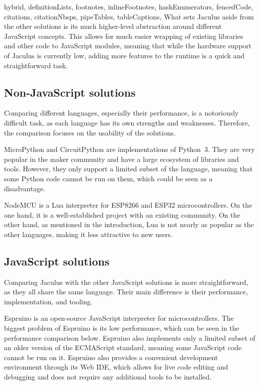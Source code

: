 \begin{markdown*}{%
  hybrid,
  definitionLists,
  footnotes,
  inlineFootnotes,
  hashEnumerators,
  fencedCode,
  citations,
  citationNbsps,
  pipeTables,
  tableCaptions,
}
What sets Jaculus aside from the other solutions is its much higher-level abstraction around different JavaScript concepts. This allows for much easier wrapping of existing libraries and other code to JavaScript modules, meaning that while the hardware support of Jaculus is currently low, adding more features to the runtime is a quick and straightforward task.

\subsection{Non-JavaScript solutions}

Comparing different languages, especially their performance, is a notoriously difficult task, as each language has its own strengths and weaknesses. Therefore, the comparison focuses on the usability of the solutions.

MicroPython and CircuitPython are implementations of Python~3. They are very popular in the maker community and have a large ecosystem of libraries and tools. However, they only support a limited subset of the language, meaning that some Python code cannot be run on them, which could be seen as a disadvantage.

NodeMCU is a Lua interpreter for ESP8266 and ESP32 microcontrollers. On the one hand, it is a well-established project with an existing community. On the other hand, as mentioned in the introduction, Lua is not nearly as popular as the other languages, making it less attractive to new users.

\subsection{JavaScript solutions}

Comparing Jaculus with the other JavaScript solutions is more straightforward, as they all share the same language. Their main difference is their performance, implementation, and tooling.

Espruino is an open-source JavaScript interpreter for microcontrollers. The biggest problem of Espruino is its low performance, which can be seen in the performance comparison below. Espruino also implements only a limited subset of an older version of the ECMAScript standard, meaning some JavaScript code cannot be run on it. Espruino also provides a convenient development environment through its Web IDE, which allows for live code editing and debugging and does not require any additional tools to be installed.


\end{markdown*}
